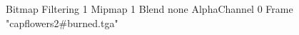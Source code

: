 {Bitmap
	{Filtering 1}
	{Mipmap 1}
	{Blend none}
	{AlphaChannel 0}
	{Frame "capflowers2#burned.tga"}
}
